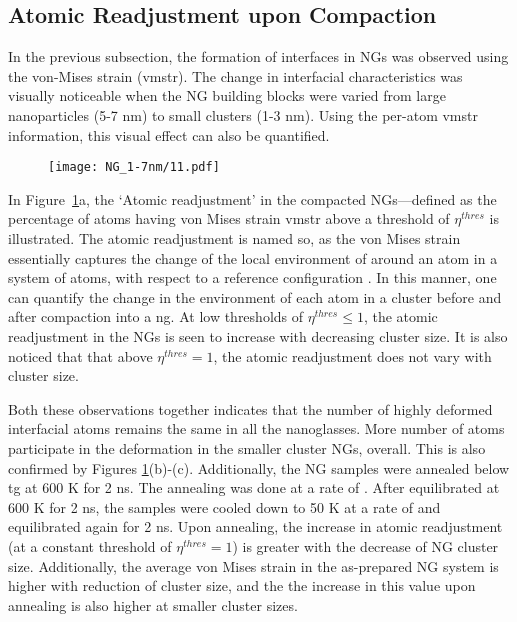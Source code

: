 \subsection{Atomic Readjustment upon Compaction}
In the previous subsection, the formation of interfaces in NGs was observed using the von-Mises strain (\gls{vmstr}). The change in interfacial characteristics was visually noticeable when the NG building blocks were varied from large nanoparticles (5-7 nm) to small clusters (1-3 nm). Using the per-atom \gls{vmstr} information, this visual effect can also be quantified. \par

\begin{figure}[!h]
	\texttt{[image: NG\_1-7nm/11.pdf]}
	\label{f:NGvonMises}
\end{figure}

In Figure~\ref{f:NGvonMises}a, the `Atomic readjustment' in the compacted NGs---defined as the percentage of atoms having von Mises strain \gls{vmstr} above a threshold of $\eta^{thres}$ is illustrated. The atomic readjustment is named so, as the von Mises strain essentially captures the change of the local environment of around an atom in a system of atoms, with respect to a reference configuration \cite{Adjaoud2018,Cheng2019,Zheng2021,Cheng2009}. In this manner, one can quantify the change in the environment of each atom in a cluster before and after compaction into a \gls{ng}. At low thresholds of $\eta^{thres} \leq 1$, the atomic readjustment in the NGs is seen to increase with decreasing cluster size. It is also noticed that that above $\eta^{thres} = 1$, the atomic readjustment does not vary with cluster size. \par

Both these observations together indicates that the number of highly deformed interfacial atoms remains the same in all the nanoglasses. More number of atoms participate in the deformation in the smaller cluster NGs, overall. This is also confirmed by Figures \mbox{\ref{f:NGvonMises}(b)-(c)}. Additionally, the NG samples were annealed below \gls{tg} at 600 K for 2 ns. The annealing was done at a rate of . After equilibrated at 600 K for 2 ns, the samples were cooled down to 50 K at a rate of  and equilibrated again for 2 ns. Upon annealing, the increase in atomic readjustment (at a constant threshold of $\eta^{thres} = 1$) is greater with the decrease of NG cluster size. Additionally, the average von Mises strain in the as-prepared NG system is higher with reduction of cluster size, and the the increase in this value upon annealing is also higher at smaller cluster sizes. \par

